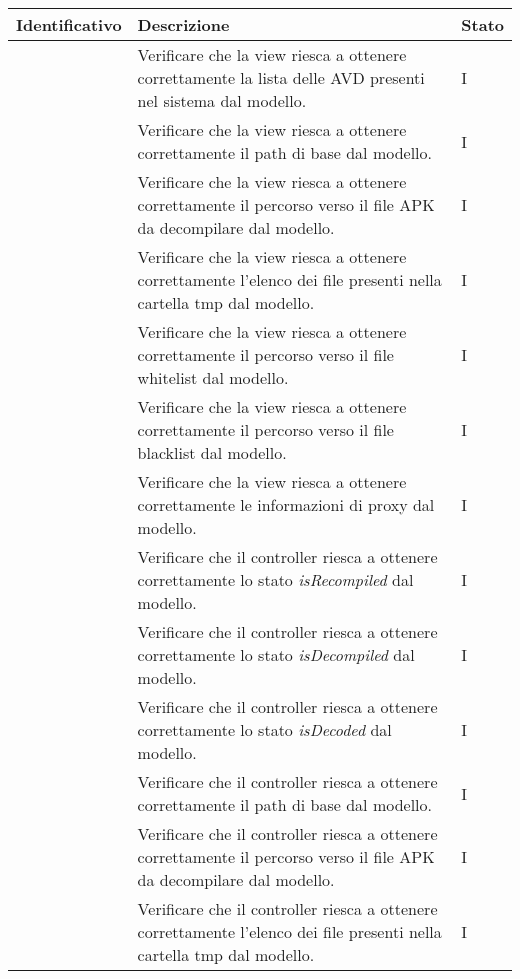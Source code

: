 \begin{center}
    \begin{longtable}{ |C{3cm} | C{8.5cm}| C{1.5cm} |}
        \hline
        \textbf{Identificativo} &
        \textbf{Descrizione} &
        \textbf{Stato} \\\hline
         &Verificare che la view riesca a ottenere correttamente la lista delle AVD presenti nel sistema dal modello. & I \\\hline
         &Verificare che la view riesca a ottenere correttamente il path di base dal modello.& I \\\hline
         &Verificare che la view riesca a ottenere correttamente il percorso verso il file APK da decompilare dal modello.& I \\\hline
         &Verificare che la view riesca a ottenere correttamente l'elenco dei file presenti nella cartella tmp dal modello.& I \\\hline
         &Verificare che la view riesca a ottenere correttamente il percorso verso il file whitelist dal modello.& I \\\hline
         &Verificare che la view riesca a ottenere correttamente il percorso verso il file blacklist dal modello.& I \\\hline
         &Verificare che la view riesca a ottenere correttamente le informazioni di proxy dal modello.& I \\\hline
         &Verificare che il controller riesca a ottenere correttamente lo stato \textit{isRecompiled} dal modello.& I \\\hline
         &Verificare che il controller riesca a ottenere correttamente lo stato \textit{isDecompiled} dal modello.& I \\\hline
         &Verificare che il controller riesca a ottenere correttamente lo stato \textit{isDecoded} dal modello.& I \\\hline
         &Verificare che il controller riesca a ottenere correttamente il path di base dal modello.& I \\\hline
         &Verificare che il controller riesca a ottenere correttamente il percorso verso il file APK da decompilare dal modello.& I \\\hline
         &Verificare che il controller riesca a ottenere correttamente l'elenco dei file presenti nella cartella tmp dal modello.& I \\\hline

\end{longtable}
\end{center}
